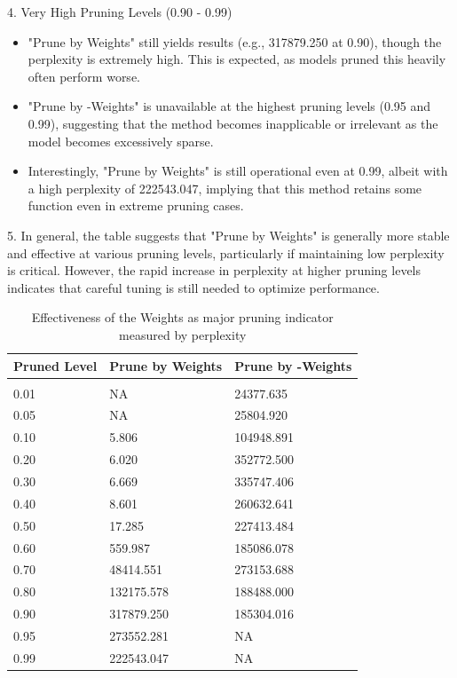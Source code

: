 \documentclass{article} %
\begin{document}
4. Very High Pruning Levels (0.90 - 0.99)
\begin{itemize}
    \item "Prune by Weights" still yields results (e.g., 317879.250 at 0.90), though the perplexity is extremely high. This is expected, as models pruned this heavily often perform worse.
    \item "Prune by -Weights" is unavailable at the highest pruning levels (0.95 and 0.99), suggesting that the method becomes inapplicable or irrelevant as the model becomes excessively sparse.
    \item Interestingly, "Prune by Weights" is still operational even at 0.99, albeit with a high perplexity of 222543.047, implying that this method retains some function even in extreme pruning cases.
\end{itemize}

5. In general, the table suggests that "Prune by Weights" is generally more stable and effective at various pruning levels, particularly if maintaining low perplexity is critical. However, the rapid increase in perplexity at higher pruning levels indicates that careful tuning is still needed to optimize performance.

\begin{table}[t]
\caption{Effectiveness of the Weights as major pruning indicator measured by perplexity}
\label{table-effectiveness-weights}
\begin{center}
\begin{tabular}{lll}
\multicolumn{1}{c}{\bf Pruned Level}  &\multicolumn{1}{c}{\bf Prune by Weights} &\multicolumn{1}{c}{\bf Prune by -Weights}
\\ \hline \\
0.01         &NA &24377.635 \\
0.05         &NA &25804.920 \\
0.10         &5.806 &104948.891 \\
0.20         &6.020 &352772.500 \\
0.30         &6.669 &335747.406 \\
0.40         &8.601 &260632.641 \\
0.50         &17.285 &227413.484 \\
0.60         &559.987 &185086.078 \\
0.70         &48414.551 &273153.688 \\
0.80         &132175.578 &188488.000 \\
0.90         &317879.250 &185304.016 \\
0.95         &273552.281 &NA \\
0.99         &222543.047 &NA \\
\end{tabular}
\end{center}
\end{table}
\end{document}
